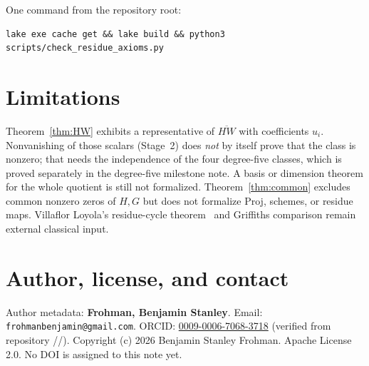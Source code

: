 \documentclass[11pt,a4paper]{article}
\theoremstyle{definition}
\begin{document}
One command from the repository root:
\begin{verbatim}
lake exe cache get && lake build && python3 scripts/check_residue_axioms.py
\end{verbatim}

\section{Limitations}

Theorem~\ref{thm:HW} exhibits a representative of $\overline{HW}$ with
coefficients $u_i$. Nonvanishing of those scalars (Stage~2) does \emph{not}
by itself prove that the class is nonzero; that needs the independence of
the four degree-five classes, which is proved separately in the degree-five
milestone note. A basis or dimension theorem for the whole quotient is still
not formalized. Theorem~\ref{thm:common} excludes common nonzero zeros of
$H,G$ but does not formalize Proj, schemes, or residue maps.
Villaflor Loyola's residue-cycle theorem~\cite{Villaflor2021} and Griffiths
comparison remain external classical input.

\section*{Author, license, and contact}
Author metadata: \textbf{Frohman, Benjamin Stanley}.
Email: \texttt{frohmanbenjamin@gmail.com}.
ORCID: \href{https://orcid.org/0009-0006-7068-3718}{0009-0006-7068-3718}
(verified from repository //).
Copyright (c) 2026 Benjamin Stanley Frohman. Apache License 2.0.
No DOI is assigned to this note yet.



\end{document}

